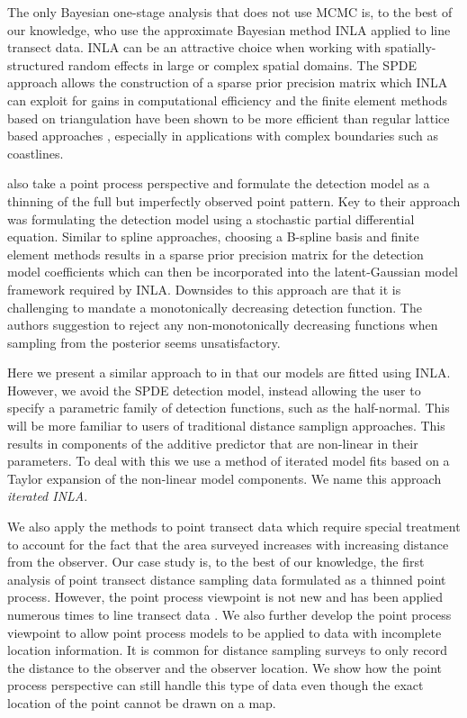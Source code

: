 \documentclass[preprint,12pt]{elsarticle}
\begin{document}
The only Bayesian one-stage analysis that does not use MCMC is, to the best of our knowledge, \citet{yuan_point_2017} who use the approximate Bayesian method INLA applied to line transect data.  INLA can be an attractive choice when working with spatially-structured random effects in large or complex spatial domains.  The SPDE approach \citep{lindgren_explicit_2011} allows the construction of a sparse prior precision matrix which INLA can exploit for gains in computational efficiency and the finite element methods based on triangulation have been shown to be more efficient than regular lattice based approaches \citep{simpson_going_2016}, especially in applications with complex boundaries such as coastlines. 

\citet{yuan_point_2017} also take a point process perspective and formulate the detection model as a thinning of the full but imperfectly observed point pattern.  Key to their approach was formulating the detection model using a stochastic partial differential equation.  Similar to spline approaches, choosing a B-spline basis and finite element methods results in a sparse prior precision matrix for the detection model coefficients which can then be incorporated into the latent-Gaussian model framework required by INLA.  Downsides to this approach are that it is challenging to mandate a monotonically decreasing detection function.  The authors suggestion to reject any non-monotonically decreasing functions when sampling from the posterior seems unsatisfactory.    

Here we present a similar approach to \citet{yuan_point_2017} in that our models are fitted using INLA.  However, we avoid the SPDE detection model, instead allowing the user to specify a parametric family of detection functions, such as the half-normal.  This will be more familiar to users of traditional distance samplign approaches.  This results in components of the additive predictor that are non-linear in their parameters.  To deal with this we use a method of iterated model fits based on a Taylor expansion of the non-linear model components.  We name this approach \textit{iterated INLA}.  

We also apply the methods to point transect data which require special treatment to account for the fact that the area surveyed increases with increasing distance from the observer.  Our case study is, to the best of our knowledge, the first analysis of point transect distance sampling data formulated as a thinned point process.  However, the point process viewpoint is not new and has been applied numerous times to line transect data \citep{buckland_model-based_2016, johnson_model-based_2010, hedley_spatial_2004,  hogmander_random_1991, stoyan_remark_1982}.  We also further develop the point process viewpoint to allow point process models to be applied to data with incomplete location information.  It is common for distance sampling surveys to only record the distance to the observer and the observer location.  We show how the point process perspective can still handle this type of data even though the exact location of the point cannot be drawn on a map.
\end{document}
